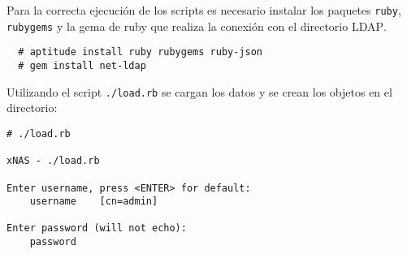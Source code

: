 {
 \begin{table}[H]
 \caption{Formato de los archivos \textsl{CSV}}{}
 \label{tab:csv-format}
 \noindent{} %
 \end{table}
}

Para la correcta ejecuci\'{o}n de los scripts es necesario instalar los paquetes \texttt{ruby}, \texttt{rubygems} y la gema de ruby que realiza la conexi\'{o}n con el directorio \textsc{LDAP}.

{
\scriptsize
\linespread{1}
\begin{verbatim}
  # aptitude install ruby rubygems ruby-json
  # gem install net-ldap
\end{verbatim}
}

Utilizando el script \texttt{./load.rb} se cargan los datos y se crean los objetos en el directorio:

{
\scriptsize
\linespread{1}
\begin{verbatim}
# ./load.rb

xNAS - ./load.rb

Enter username, press <ENTER> for default:
    username    [cn=admin]

Enter password (will not echo):
    password
\end{verbatim}
}


{
 \begin{table}[H]
 \caption{Script de carga de objetos en el directorio}{}
 \label{tab:load-rb}
 \noindent{} %
 \end{table}
}

